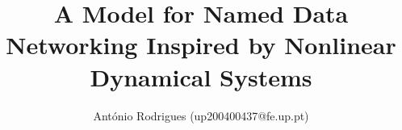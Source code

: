 \documentclass[english,journal]{IEEEtran}
\begin{document}
\title{A Model for Named Data Networking Inspired by 
Nonlinear Dynamical Systems}
\author{António Rodrigues (up200400437@fe.up.pt)}

\maketitle










%



%







\end{document}
